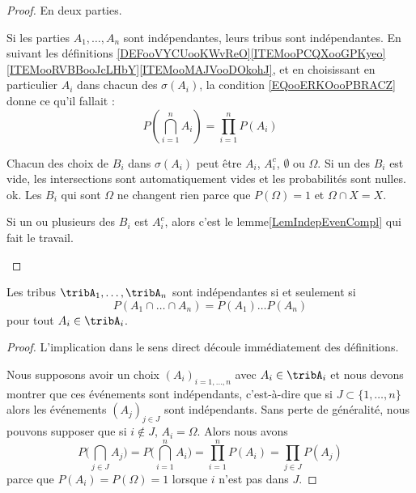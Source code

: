 \begin{proof}
	En deux parties.
	\begin{subproof}
		\spitem[\( \Rightarrow\)]
		Si les parties \( A_1,\ldots,A_n\) sont indépendantes, leurs tribus sont indépendantes. En suivant les définitions \ref{DEFooVYCUooKWvReO}\ref{ITEMooPCQXooGPKyeo}\ref{ITEMooRVBBooJcLHbY}\ref{ITEMooMAJVooDOkohJ}, et en choisissant en particulier \( A_i\) dans chacun des \( \sigma(A_i)\), la condition \eqref{EQooERKOooPBRACZ} donne ce qu'il fallait :
		\begin{equation}
			P(\bigcap_{i=1}^nA_i)=\prod_{i=1}^nP(A_i)
		\end{equation}

		\spitem[\( \Leftarrow\)]
		Chacun des choix de \( B_i\) dans \( \sigma(A_i)\) peut être \( A_i\), \( A_i^c\), \( \emptyset\) ou \( \Omega\). Si un des \( B_i\) est vide, les intersections sont automatiquement vides et les probabilités sont nulles. ok. Les \( B_i\) qui sont \( \Omega\) ne changent rien parce que \( P(\Omega)=1\) et \( \Omega\cap X=X\).

		Si un ou plusieurs des \( B_i\) est \( A_i^c\), alors c'est le lemme\ref{LemIndepEvenCompl} qui fait le travail.
	\end{subproof}
\end{proof}

\begin{lemma}       \label{LemTribIndepProdProb}
	Les tribus \( \tribA_1,\ldots,\tribA_n\) sont indépendantes si et seulement si
	\begin{equation}
		P(A_1\cap\ldots\cap A_n)=P(A_1)\ldots P(A_n)
	\end{equation}
	pour tout \( A_i\in\tribA_i\).
\end{lemma}

\begin{proof}
	L'implication dans le sens direct découle immédiatement des définitions.

	Nous supposons avoir un choix \( (A_i)_{i=1,\ldots,n}\) avec \( A_i\in\tribA_i\) et nous devons montrer que ces événements sont indépendants, c'est-à-dire que si \( J\subset\{ 1,\ldots,n \}\) alors les événements \( (A_j)_{j\in J}\) sont indépendants. Sans perte de généralité, nous pouvons supposer que si \( i\notin J\), \( A_i=\Omega\). Alors nous avons
	\begin{equation}
		P\big( \bigcap_{j\in J}A_j \big)=P\big( \bigcap_{i=1}^nA_i \big)=\prod_{i=1}^nP(A_i)=\prod_{j\in J}P(A_j)
	\end{equation}
	parce que \( P(A_i)=P(\Omega)=1\) lorsque \( i\) n'est pas dans \( J\).
\end{proof}

